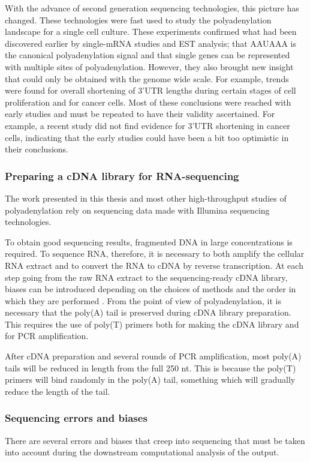 With the advance of second generation sequencing technologies, this picture has
changed. These technologies were fast used to study the polyadenylation
landscape for a single cell culture. These experiments confirmed what had been
discovered earlier by single-mRNA studies and EST analysis; that AAUAAA is the
canonical polyadenylation signal and that single genes can be represented
with multiple sites of polyadenylation. However, they also brought new insight
that could only be obtained with the genome wide scale. For example, trends
were found for overall shortening of 3'UTR lengths during certain stages of
cell proliferation and for cancer cells. Most of these conclusions were reached
with early studies and must be repeated to have their validity ascertained. For
example, a recent study did not find evidence for 3'UTR shortening in cancer
cells, indicating that the early studies could have been a bit too optimistic
in their conclusions.

\subsubsection{Preparing a cDNA library for RNA-sequencing}
The work presented in this thesis and most other high-throughput studies of
polyadenylation rely on sequencing data made with Illumina sequencing
technologies.

To obtain good sequencing results, fragmented DNA in large concentrations is
required. To sequence RNA, therefore, it is necessary to both amplify the
cellular RNA extract and to convert the RNA to cDNA by reverse transcription.
At each step going from the raw RNA extract to the sequencing-ready cDNA
library, biases can be introduced depending on the choices of methods and the
order in which they are performed \cite{wang_rna-seq:_2009}. From the point of
view of polyadenylation, it is necessary that the poly(A) tail is preserved
during cDNA library preparation. This requires the use of poly(T) primers both for
making the cDNA library and for PCR amplification.

After cDNA preparation and  several rounds of PCR amplification, most poly(A)
tails will be reduced in length from the full 250 nt. This is because the
poly(T) primers will bind randomly in the poly(A) tail, something which will
gradually reduce the length of the tail.

\subsubsection{Sequencing errors and biases}
There are several errors and biases that creep into sequencing that must be
taken into account during the downstream computational analysis of the output.

